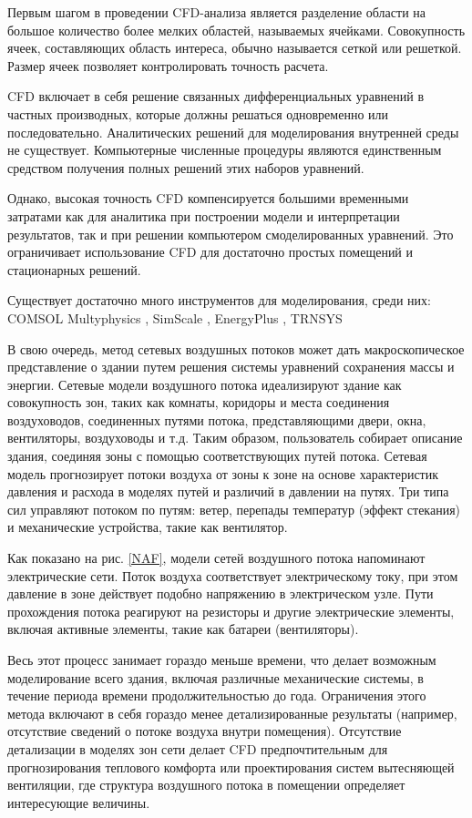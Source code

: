 Первым шагом в проведении CFD-анализа является разделение области на большое количество более мелких областей, называемых ячейками. Совокупность ячеек, составляющих область интереса, обычно называется сеткой или решеткой. Размер ячеек позволяет контролировать точность расчета.

CFD включает в себя решение связанных дифференциальных уравнений в частных производных, которые должны решаться одновременно или последовательно. Аналитических решений для моделирования внутренней среды не существует. Компьютерные численные процедуры являются единственным средством получения полных решений этих наборов уравнений.

Однако, высокая точность CFD компенсируется большими временными затратами как для аналитика при построении модели и интерпретации результатов, так и при решении компьютером смоделированных уравнений. Это ограничивает использование CFD для достаточно простых помещений и стационарных решений.

Существует достаточно много инструментов для моделирования, среди них: COMSOL Multyphysics \cite{comsol}, SimScale \cite{simscale}, EnergyPlus \cite{energyplus}, TRNSYS \cite{trnsys}

\newpage

В свою очередь, метод сетевых воздушных потоков может дать макроскопическое представление о здании путем решения системы уравнений сохранения массы и энергии. Сетевые модели воздушного потока идеализируют здание как совокупность зон, таких как комнаты, коридоры и места соединения воздуховодов, соединенных путями потока, представляющими двери, окна, вентиляторы, воздуховоды и т.д. Таким образом, пользователь собирает описание здания, соединяя зоны с помощью соответствующих путей потока. Сетевая модель прогнозирует потоки воздуха от зоны к зоне на основе характеристик давления и расхода в моделях путей и различий в давлении на путях. Три типа сил управляют потоком по путям: ветер, перепады температур (эффект стекания) и механические устройства, такие как вентилятор.

Как показано на рис. \ref{NAF}, модели сетей воздушного потока напоминают электрические сети. Поток воздуха соответствует электрическому току, при этом давление в зоне действует подобно напряжению в электрическом узле. Пути прохождения потока реагируют на резисторы и другие электрические элементы, включая активные элементы, такие как батареи (вентиляторы).

Весь этот процесс занимает гораздо меньше времени, что делает возможным моделирование всего здания, включая различные механические системы, в течение периода времени продолжительностью до года. Ограничения этого метода включают в себя гораздо менее детализированные результаты (например, отсутствие сведений о потоке воздуха внутри помещения). Отсутствие детализации в моделях зон сети делает CFD предпочтительным для прогнозирования теплового комфорта или проектирования систем вытесняющей вентиляции, где структура воздушного потока в помещении определяет интересующие величины.

